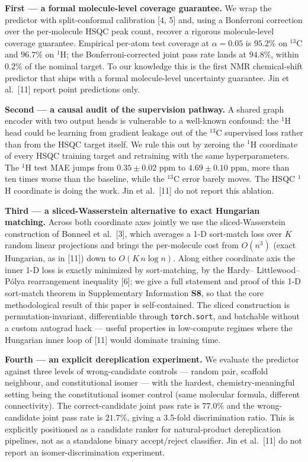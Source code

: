 \documentclass[
  11pt,
  a4paper,
]{article}
\begin{document}
\textbf{First --- a formal molecule-level coverage guarantee.} We wrap the
predictor with split-conformal calibration {[}4, 5{]} and, using a
Bonferroni correction over the per-molecule HSQC peak count, recover
a rigorous molecule-level coverage guarantee. Empirical per-atom test
coverage at \(\alpha = 0.05\) is \(95.2\%\) on \(^{13}\)C and \(96.7\%\) on
\(^{1}\)H; the Bonferroni-corrected joint pass rate lands at
\(\mathbf{94.8\%}\), within \(0.2\%\) of the nominal target. To our
knowledge this is the first NMR chemical-shift predictor that ships
with a formal molecule-level uncertainty guarantee. Jin et al.~{[}11{]}
report point predictions only.

\textbf{Second --- a causal audit of the supervision pathway.} A shared
graph encoder with two output heads is vulnerable to a well-known
confound: the \(^{1}\)H head could be learning from gradient leakage
out of the \(^{13}\)C supervised loss rather than from the HSQC target
itself. We rule this out by zeroing the \(^{1}\)H coordinate of every
HSQC training target and retraining with the same hyperparameters.
The \(^{1}\)H test MAE jumps from \(0.35 \pm 0.02\) ppm to
\(4.69 \pm 0.10\) ppm, more than ten times worse than the baseline,
while the \(^{13}\)C error barely moves. The HSQC \(^{1}\)H coordinate is
doing the work. Jin et al.~{[}11{]} do not report this ablation.

\textbf{Third --- a sliced-Wasserstein alternative to exact Hungarian
matching.} Across both coordinate axes jointly we use the
sliced-Wasserstein construction of Bonneel et al.~{[}3{]}, which averages
a 1-D sort-match loss over \(K\) random linear projections and brings
the per-molecule cost from \(O(n^{3})\) (exact Hungarian, as in {[}11{]})
down to \(O(K\,n \log n)\). Along either coordinate axis the inner
1-D loss is exactly minimized by sort-matching, by the Hardy--
Littlewood--Pólya rearrangement inequality {[}6{]}; we give a full
statement and proof of this 1-D sort-match theorem in
Supplementary Information \textbf{S8}, so that the core methodological
result of this paper is self-contained. The sliced construction is
permutation-invariant, differentiable through \texttt{torch.sort}, and
batchable without a custom autograd hack --- useful properties in
low-compute regimes where the Hungarian inner loop of {[}11{]} would
dominate training time.

\textbf{Fourth --- an explicit dereplication experiment.} We evaluate the
predictor against three levels of wrong-candidate controls --- random
pair, scaffold neighbour, and constitutional isomer --- with the
hardest, chemistry-meaningful setting being the constitutional
isomer control (same molecular formula, different connectivity).
The correct-candidate joint pass rate is \(77.0\%\) and the
wrong-candidate joint pass rate is \(21.7\%\), giving a 3.5-fold
discrimination ratio. This is explicitly positioned as a candidate
ranker for natural-product dereplication pipelines, not as a
standalone binary accept/reject classifier. Jin et al.~{[}11{]} do not
report an isomer-discrimination experiment.
\end{document}
